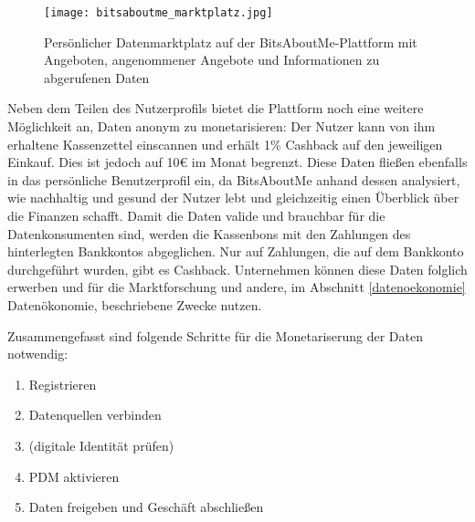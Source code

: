 \begin{figure}[!ht]
	\centering
	\texttt{[image: bitsaboutme\_marktplatz.jpg]}
	\caption{Persönlicher Datenmarktplatz auf der BitsAboutMe-Plattform mit Angeboten, angenommener Angebote und Informationen zu abgerufenen Daten}
	\label{fig:bitsaboutmeMarktplatz}
\end{figure}
\FloatBarrier

\noindent Neben dem Teilen des Nutzerprofils bietet die Plattform noch eine weitere Möglichkeit an, Daten anonym zu monetarisieren: Der Nutzer kann von ihm erhaltene Kassenzettel einscannen und erhält 1\% Cashback auf den jeweiligen Einkauf. Dies ist jedoch auf 10€ im Monat begrenzt. Diese Daten fließen ebenfalls in das persönliche Benutzerprofil ein, da BitsAboutMe anhand dessen analysiert, wie nachhaltig und gesund der Nutzer lebt und gleichzeitig einen Überblick über die Finanzen schafft. Damit die Daten valide und brauchbar für die Datenkonsumenten sind, werden die Kassenbons mit den Zahlungen des hinterlegten Bankkontos abgeglichen. Nur auf Zahlungen, die auf dem Bankkonto durchgeführt wurden, gibt es Cashback. Unternehmen können diese Daten folglich erwerben und für die Marktforschung und andere, im Abschnitt \ref{datenoekonomie} Datenökonomie, beschriebene Zwecke nutzen. \newline

\newpage
\noindent Zusammengefasst sind folgende Schritte für die Monetariserung der Daten notwendig:
\begin{enumerate}
	\item Registrieren
	\item Datenquellen verbinden
	\item (digitale Identität prüfen)
	\item PDM aktivieren
	\item Daten freigeben und Geschäft abschließen
\end{enumerate}